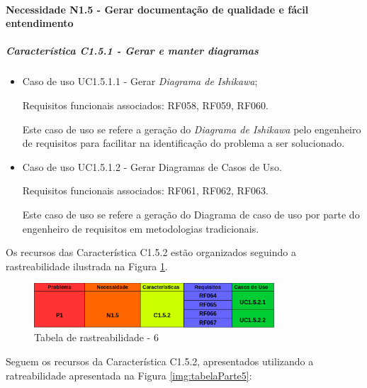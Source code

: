 \paragraph{Necessidade N1.5 - Gerar documentação de qualidade e fácil entendimento}
	\subparagraph{Característica C1.5.1 - Gerar e manter diagramas}
		\begin{itemize}
					
			\item Caso de uso UC1.5.1.1 - Gerar \textit{Diagrama de Ishikawa};
				
				Requisitos funcionais associados: RF058, RF059, RF060.

				Este caso de uso se refere a geração do \textit{Diagrama de Ishikawa} pelo engenheiro de requisitos para facilitar na identificação do problema a ser solucionado.
			
			\item Caso de uso UC1.5.1.2 - Gerar Diagramas de Casos de Uso.
				
				Requisitos funcionais associados: RF061, RF062, RF063.

				Este caso de uso se refere a geração do Diagrama de caso de uso por parte do engenheiro de requisitos em metodologias tradicionais.
		\end{itemize}

Os recursos das Característica C1.5.2 estão organizados seguindo a rastreabilidade ilustrada na Figura \ref{img:tabelaParte6}.

\begin{figure}[H]
	\centering
	\includegraphics[width=0.8\textwidth]{imgModelagem/tabelaParte6}
	\caption{Tabela de rastreabilidade - 6 }
	\label{img:tabelaParte6}
\end{figure}

	Seguem os recursos da Característica C1.5.2, apresentados utilizando a ratreabilidade apresentada na Figura \ref{img:tabelaParte5}:

